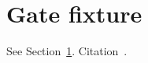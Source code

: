 \documentclass{article}
\newcommand{\tightlist}{}
\begin{document}
\tightlist
\section{Gate fixture}\label{sec:gate}
See Section~\ref{sec:gate}. Citation~\cite{fixture}.


\end{document}
